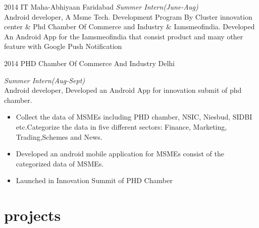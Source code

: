 \documentclass[]{friggeri-cv}
\begin{document}
\begin{entrylist}
  \entry
    {2014}
    {IT Maha-Abhiyaan}
    {Faridabad}
    {\emph{Summer Intern(June-Aug)}\\ Android developer, A Msme Tech. Development Program By Cluster innovation center \& Phd Chamber Of Commerce and Industry \& Iamsmeofindia. \newline Developed An Android App for the Iamsmeofindia that consist product and many other feature with Google Push Notification}

  \entry
    {2014}
    {PHD Chamber Of Commerce And Industry}
    {Delhi}
    {\emph{Summer Intern(Aug-Sept)}\\ Android developer, Developed an Android App for innovation submit of phd chamber. \begin{itemize}
    \item Collect the data of MSMEs including PHD chamber, NSIC, Niesbud, SIDBI etc.Categorize the data in five different sectors: Finance, Marketing, Trading,Schemes and News.
    \item Developed an android mobile application for MSMEs consist of the categorized data of MSMEs.
    \item Launched in Innovation Summit of PHD Chamber
    \end{itemize}}
   
\end{entrylist} 

\section{projects}
\end{document}
